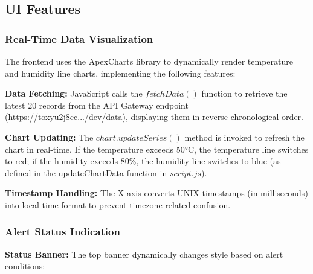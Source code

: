 \documentclass[12pt,a4paper]{article}
\begin{document}
\subsection{UI Features}

\subsubsection{Real-Time Data Visualization}
The frontend uses the ApexCharts library to dynamically render temperature and humidity line charts, implementing the following features:

\vspace{\baselineskip}
\noindent
\textbf{Data Fetching:} JavaScript calls the $fetchData()$ function to retrieve the latest 20 records from the API Gateway endpoint (https://toxyu2j8cc.../dev/data), displaying them in reverse chronological order.

\vspace{\baselineskip}
\noindent
\textbf{Chart Updating:} The $chart.updateSeries()$ method is invoked to refresh the chart in real-time. If the temperature exceeds 50°C, the temperature line switches to red; if the humidity exceeds 80\%, the humidity line switches to blue (as defined in the updateChartData function in $script.js$).

\vspace{\baselineskip}
\noindent
\textbf{Timestamp Handling:} The X-axis converts UNIX timestamps (in milliseconds) into local time format to prevent timezone-related confusion.

\subsubsection{Alert Status Indication}
\textbf{Status Banner:} The top banner dynamically changes style based on alert conditions:
\end{document}
